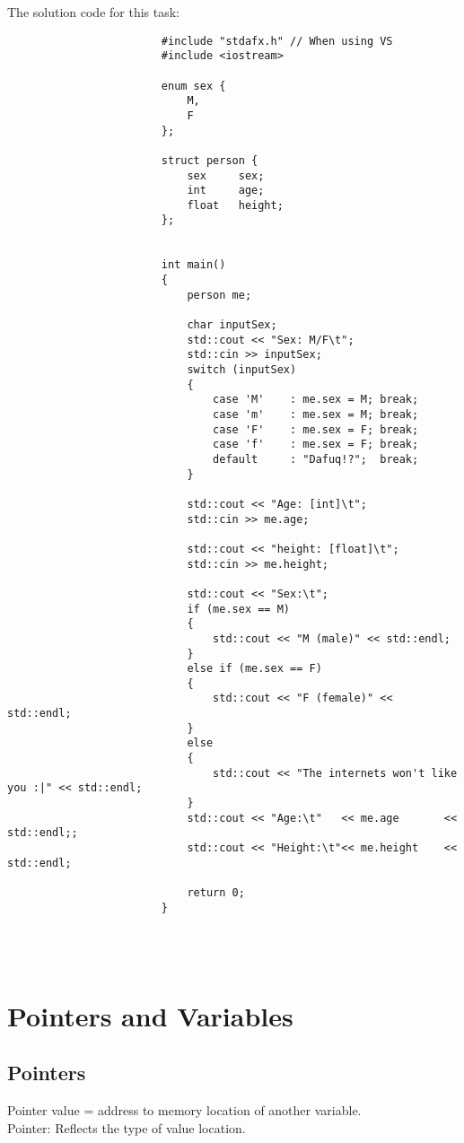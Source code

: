 \documentclass{report}
\begin{document}
				
				\begin{minipage}{\linewidth}
					The solution code for this task:
					\begin{lstlisting}
						#include "stdafx.h"	// When using VS
						#include <iostream>
						
						enum sex {
							M,
							F
						};
						
						struct person {
							sex		sex;
							int		age;
							float	height;
						};
						
						
						int main()
						{
							person me;
							
							char inputSex;
							std::cout << "Sex: M/F\t";
							std::cin >> inputSex;
							switch (inputSex)
							{
								case 'M'	: me.sex = M; break;
								case 'm'	: me.sex = M; break;
								case 'F'	: me.sex = F; break;
								case 'f'	: me.sex = F; break;
								default		: "Dafuq!?";  break;
							}
							
							std::cout << "Age: [int]\t";
							std::cin >> me.age;
							
							std::cout << "height: [float]\t";
							std::cin >> me.height;
							
							std::cout << "Sex:\t";
							if (me.sex == M)
							{
								std::cout << "M (male)" << std::endl;
							}
							else if (me.sex == F)
							{
								std::cout << "F (female)" << std::endl;
							}
							else
							{
								std::cout << "The internets won't like you :|" << std::endl;
							}
							std::cout << "Age:\t"	<< me.age		<< std::endl;;
							std::cout << "Height:\t"<< me.height	<< std::endl;
							
							return 0;
						}
					\end{lstlisting}
				\end{minipage}
				\\ \\
		
		
		
		\section{Pointers and Variables}
			\subsection{Pointers}
				Pointer value = address to memory location of another variable. \\
				Pointer: Reflects the type of value location. \\
				
\end{document}
